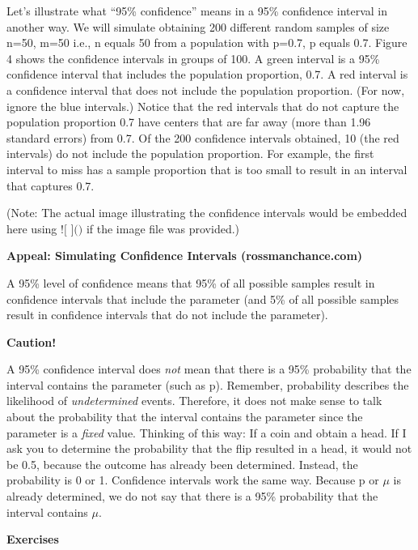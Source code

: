 \documentclass[
]{book}
\begin{document}
Let's illustrate what ``95\% confidence'' means in a 95\% confidence interval in another way. We will simulate obtaining 200 different random samples of size n=50, m=50 i.e., n equals 50 from a population with p=0.7, p equals 0.7. Figure 4 shows the confidence intervals in groups of 100. A green interval is a 95\% confidence interval that includes the population proportion, 0.7. A red interval is a confidence interval that does not include the population proportion. (For now, ignore the blue intervals.) Notice that the red intervals that do not capture the population proportion 0.7 have centers that are far away (more than 1.96 standard errors) from 0.7. Of the 200 confidence intervals obtained, 10 (the red intervals) do not include the population proportion. For example, the first interval to miss has a sample proportion that is too small to result in an interval that captures 0.7.

(Note: The actual image illustrating the confidence intervals would be embedded here using \(\text{![ ]()}\) if the image file was provided.)

\textbf{Appeal: Simulating Confidence Intervals (rossmanchance.com)}

A 95\% level of confidence means that 95\% of all possible samples result in confidence intervals that include the parameter (and 5\% of all possible samples result in confidence intervals that do not include the parameter).

\textbf{Caution!}

A 95\% confidence interval does \emph{not} mean that there is a 95\% probability that the interval contains the parameter (such as p). Remember, probability describes the likelihood of \emph{undetermined} events. Therefore, it does not make sense to talk about the probability that the interval contains the parameter since the parameter is a \emph{fixed} value. Thinking of this way: If a coin and obtain a head. If I ask you to determine the probability that the flip resulted in a head, it would not be 0.5, because the outcome has already been determined. Instead, the probability is 0 or 1. Confidence intervals work the same way. Because p or \(\mu\) is already determined, we do not say that there is a 95\% probability that the interval contains \(\mu\).

\textbf{Exercises}
\end{document}
